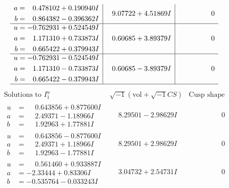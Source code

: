 \documentclass[1p]{elsarticle_modified}
\theoremstyle{definition}
\newcommand{\I}{\sqrt{-1}}
\begin{document}
$$\begin{array}{c|c|c}
\begin{aligned}
a &= \phantom{-}0.478102 + 0.190940 I \\
b &= \phantom{-}0.864382 - 0.396362 I\end{aligned}
 & \phantom{-}9.07722 + 4.51869 I & \phantom{-0.000000 } 0 \\ \hline\begin{aligned}
u &= -0.762931 + 0.524549 I \\
a &= \phantom{-}1.171310 + 0.733873 I \\
b &= \phantom{-}0.665422 + 0.379943 I\end{aligned}
 & \phantom{-}0.60685 + 3.89379 I & \phantom{-0.000000 } 0 \\ \hline\begin{aligned}
u &= -0.762931 - 0.524549 I \\
a &= \phantom{-}1.171310 - 0.733873 I \\
b &= \phantom{-}0.665422 - 0.379943 I\end{aligned}
 & \phantom{-}0.60685 - 3.89379 I & \phantom{-0.000000 } 0\\
 \hline 
 \end{array}$$\newpage$$\begin{array}{c|c|c}  
\text{Solutions to }I^u_{1}& \I (\text{vol} + \sqrt{-1}CS) & \text{Cusp shape}\\
 \hline 
\begin{aligned}
u &= \phantom{-}0.643856 + 0.877600 I \\
a &= \phantom{-}2.49371 - 1.18966 I \\
b &= \phantom{-}1.92963 + 1.77881 I\end{aligned}
 & \phantom{-}8.29501 - 2.98629 I & \phantom{-0.000000 } 0 \\ \hline\begin{aligned}
u &= \phantom{-}0.643856 - 0.877600 I \\
a &= \phantom{-}2.49371 + 1.18966 I \\
b &= \phantom{-}1.92963 - 1.77881 I\end{aligned}
 & \phantom{-}8.29501 + 2.98629 I & \phantom{-0.000000 } 0 \\ \hline\begin{aligned}
u &= \phantom{-}0.561460 + 0.933887 I \\
a &= -2.33444 + 0.83306 I \\
b &= -0.535764 - 0.033243 I\end{aligned}
 & \phantom{-}3.04732 + 2.54731 I & \phantom{-0.000000 } 0 \\ \hline\begin{aligned}

\end{aligned}
\end{array}$$
\end{document}
